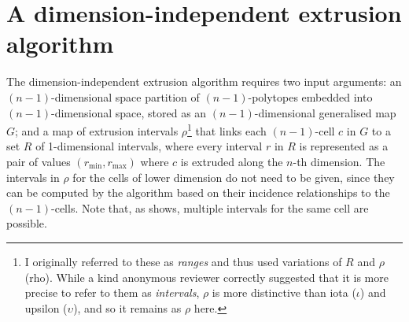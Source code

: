 \section{A dimension-independent extrusion algorithm}
\label{se:extrusion-algos}

The dimension-independent extrusion algorithm requires two input arguments: an $(n-1)$-dimensional space partition of $(n-1)$-polytopes embedded into $(n-1)$-dimensional space, stored as an $(n-1)$-dimensional generalised map $G$; and a map of extrusion intervals $\rho$\footnote{I originally referred to these as \emph{ranges} and thus used variations of $R$ and $\rho$ (rho).
While a kind anonymous reviewer correctly suggested that it is more precise to refer to them as \emph{intervals}, $\rho$ is more distinctive than iota ($\iota$) and upsilon ($\upsilon$), and so it remains as $\rho$ here.} that links each $(n-1)$-cell $c$ in $G$ to a set $R$ of 1-dimensional intervals, where every interval $r$ in $R$ is represented as a pair of values $(r_{\min}, r_{\max})$ where $c$ is extruded along the $n$-th dimension.
The intervals in $\rho$ for the cells of lower dimension do not need to be given, since they can be computed by the algorithm based on their incidence relationships to the $(n-1)$-cells.
Note that, as  shows, multiple intervals for the same cell are possible.
